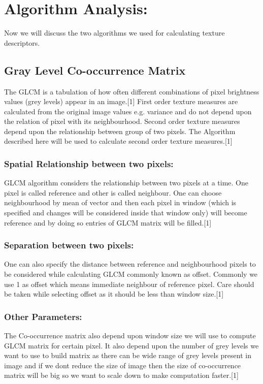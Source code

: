 \documentclass{article}
\begin{document}
\section{Algorithm Analysis:}
Now we will discuss the two algorithms we used for calculating texture descriptors. 
\subsection{Gray Level Co-occurrence Matrix }
The GLCM is a tabulation of how often different combinations of pixel brightness values (grey levels) appear in an image.[1] First order texture measures are calculated from the original image values e.g. variance and do not depend upon the relation of pixel with its neighbourhood. Second order texture measures depend upon the relationship between group of two pixels. The Algorithm described here will be used to calculate second order texture measures.[1]
\subsubsection{Spatial Relationship between two pixels:}
GLCM algorithm considers the relationship between two pixels at a time. One pixel is called reference and other is called neighbour. One can choose neighbourhood by mean of vector and then each pixel in window (which is specified and changes will be considered inside that window only) will become reference and by doing so entries of GLCM matrix will be filled.[1]
\subsubsection{Separation between two pixels:}
One can also specify the distance between reference and neighbourhood pixels to be considered while calculating GLCM commonly known as offset. Commonly we use 1 as offset which means immediate neighbour of reference pixel. Care should be taken while selecting offset as it should be less than window size.[1]
\subsubsection{Other Parameters:}
The Co-occurrence matrix also depend upon window size we will use to compute GLCM matrix for certain pixel. It also depend upon the number of grey levels we want to use to build matrix as there can be wide range of grey levels present in image and if we dont reduce the size of image then the size of co-occurrence matrix will be big so we want to scale down to make computation faster.[1]
\end{document}
